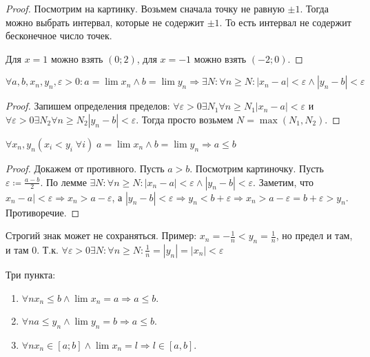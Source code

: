 \begin{proof}
    Посмотрим на картинку. Возьмем сначала точку не равную $\pm 1$. Тогда можно выбрать интервал, которые не содержит $\pm 1$. То есть интервал не содержит бесконечное число точек.

    Для $x=1$ можно взять  $(0;2)$, для  $x=-1$ можно взять  $(-2;0)$.
\end{proof}
\begin{lemma}
    $\forall a, b, x_n, y_n, \varepsilon > 0: a = \lim x_n \land b = \lim y_n \Rightarrow \exists N: \forall n \ge N: |x_n-a| < \varepsilon \land |y_n-b| < \varepsilon$ 
\end{lemma}
\begin{proof}
    Запишем определения пределов: $\forall \varepsilon > 0 \exists N_1 \forall n \ge N_1 |x_n-a| < \varepsilon$ и $\forall \varepsilon > 0 \exists N_2 \forall n \ge N_2 |y_n-b| < \varepsilon$. Тогда просто возьмем $N=\max(N_1, N_2)$.
\end{proof}
\begin{theorem}
    $\forall x_n, y_n (x_i < y_i \; \forall i)\; a = \lim x_n \land b = \lim y_n \Rightarrow a \le b$
\end{theorem}
\begin{proof}
    Докажем от противного. Пусть $a>b$. Посмотрим картиночку. Пусть $\varepsilon \coloneqq \frac{a-b}{2}$. По лемме $\exists N: \forall n \ge N: |x_n-a|<\varepsilon \land |y_n-b|<\varepsilon$. Заметим, что $x_n-a| < \varepsilon \Rightarrow x_n > a - \varepsilon$, а $|y_n-b|<\varepsilon \Rightarrow y_n < b + \varepsilon \Rightarrow x_n > a - \varepsilon = b + \varepsilon > y_n$. Противоречие.
\end{proof}
\begin{remark}
    Строгий знак может не сохраняться. Пример: $x_n = -\frac{1}{n} < y_n = \frac{1}{n}$, но предел и там, и там 0. Т.к. $\forall \varepsilon > 0 \exists N: \forall n \ge N: \frac{1}{n} = |y_n| = |x_n| < \varepsilon$ 
\end{remark}
\begin{consequence}
   Три пункта:
   \begin{enumerate}
       \item $\forall n x_n \le b \land \lim x_n = a \Rightarrow a \le b$.
       \item $\forall n a \le y_n \land \lim y_n = b \Rightarrow a \le b$.
       \item $\forall n x_n \in [a;b] \land \lim x_n = l \Rightarrow l \in [a, b]$.
   \end{enumerate}
\end{consequence}
